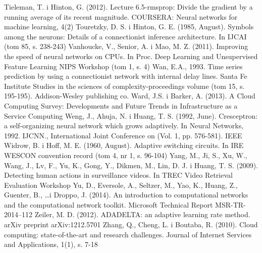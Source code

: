 \documentclass[12pt,a4paper,twoside]{article}
\begin{document}
\begin{thebibliography}{99}
 Tieleman, T. i Hinton, G. (2012). Lecture 6.5-rmsprop: Divide the gradient by a running average of its recent magnitude. COURSERA: Neural networks for machine learning, 4(2)
 Touretzky, D. S. i Hinton, G. E. (1985, August). Symbols among the neurons: Details of a connectionist inference architecture. In IJCAI (tom 85, s. 238-243)
 Vanhoucke, V., Senior, A. i Mao, M. Z. (2011). Improving the speed of neural networks on CPUs. In Proc. Deep Learning and Unsupervised Feature Learning NIPS Workshop (tom 1, s. 4)
 Wan, E.A., 1993. Time series prediction by using a connectionist network with internal delay lines. Santa Fe Institute Studies in the sciences of complexity-proceedings volume (tom 15, s. 195-195). Addison-Wesley publishing co.
 Ward, J.S. i Barker, A. (2013). A Cloud Computing Survey: Developments and Future Trends in Infrastructure as a Service Computing
 Weng, J., Ahuja, N. i Huang, T. S. (1992, June). Cresceptron: a self-organizing neural network which grows adaptively. In Neural Networks, 1992. IJCNN., International Joint Conference on (Vol. 1, pp. 576-581). IEEE
 Widrow, B. i Hoff, M. E. (1960, August). Adaptive switching circuits. In IRE WESCON convention record (tom 4, nr 1, s. 96-104)
 Yang, M., Ji, S., Xu, W., Wang, J., Lv, F., Yu, K., Gong, Y., Dikmen, M., Lin, D. J. i Huang, T. S. (2009). Detecting human actions in surveillance videos. In TREC Video Retrieval Evaluation Workshop
 Yu, D., Eversole, A., Seltzer, M., Yao, K., Huang, Z., Guenter, B., \ldots i Droppo, J. (2014). An introduction to computational networks and the computational network toolkit. Microsoft Technical Report MSR-TR-2014–112
 Zeiler, M. D. (2012). ADADELTA: an adaptive learning rate method. arXiv preprint arXiv:1212.5701
 Zhang, Q., Cheng, L. i Boutaba, R. (2010). Cloud computing: state-of-the-art and research challenges. Journal of Internet Services and Applications, 1(1), s. 7-18

\end{thebibliography}
\clearpage

\listoffigures

\clearpage
\end{document}
